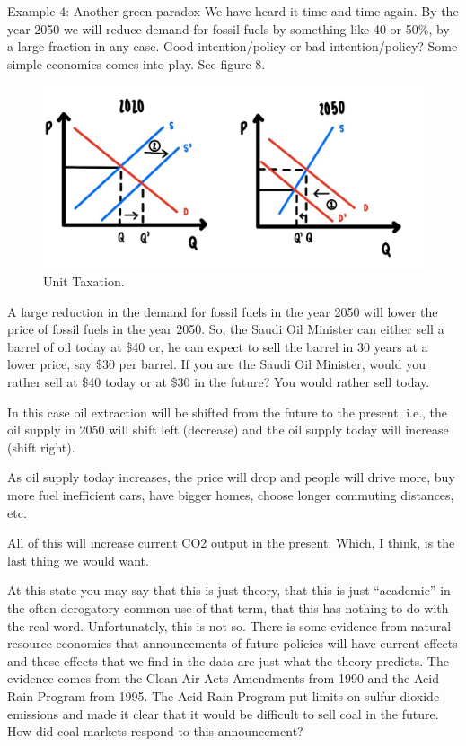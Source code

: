 \documentclass[
]{book}
\begin{document}
Example 4: Another green paradox
We have heard it time and time again. By the year 2050 we will reduce demand for fossil fuels by something like 40 or 50\%, by a large fraction in any case.
Good intention/policy or bad intention/policy?
Some simple economics comes into play. See figure 8.

\begin{figure}

{\centering \includegraphics[width=0.5\linewidth]{img/ch5/fig8} 

}

\caption{Unit Taxation.}\label{fig:fig508}
\end{figure}

A large reduction in the demand for fossil fuels in the year 2050 will lower the price of fossil fuels in the year 2050. So, the Saudi Oil Minister can either sell a barrel of oil today at \$40 or, he can expect to sell the barrel in 30 years at a lower price, say \$30 per barrel. If you are the Saudi Oil Minister, would you rather sell at \$40 today or at \$30 in the future?
You would rather sell today.

In this case oil extraction will be shifted from the future to the present, i.e., the oil supply in 2050 will shift left (decrease) and the oil supply today will increase (shift right).

As oil supply today increases, the price will drop and people will drive more, buy more fuel inefficient cars, have bigger homes, choose longer commuting distances, etc.

All of this will increase current CO2 output in the present. Which, I think, is the last thing we would want.

At this state you may say that this is just theory, that this is just ``academic'' in the often-derogatory common use of that term, that this has nothing to do with the real word. Unfortunately, this is not so. There is some evidence from natural resource economics that announcements of future policies will have current effects and these effects that we find in the data are just what the theory predicts. The evidence comes from the Clean Air Acts Amendments from 1990 and the Acid Rain Program from 1995. The Acid Rain Program put limits on sulfur-dioxide emissions and made it clear that it would be difficult to sell coal in the future. How did coal markets respond to this announcement?
\end{document}
